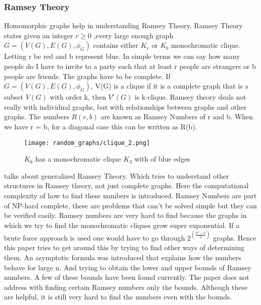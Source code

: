 \documentclass[12pt, a4paper]{Assignment}
\begin{document}
\subsubsection*{Ramsey Theory}
Homomorphic graphs help in understanding Ramsey Theory.
Ramsey Theory states given an integer $ r\geq 0$ ,every large enough graph $G = (V(G),E(G),\phi_G)$ contains either  $K_r $ or ${K_b}$ monochromatic clique.\cite{katz2018introduction}
Letting r be red and b represent blue.
In simple terms we can say how many people do I have to invite to a party such that at least r people are strangers or b people are friends.
The graphs have to be complete.
If $G = (V(G), E(G),\phi_G)$, V(G) is a clique if it is a complete graph that is a subset $V(G)$ with order k, then $V'(G)$ is k-clique.\cite{katz2018introduction} 
Ramsey theory deals not really with individual graphs, but with relationships between graphs and other graphs. 
The numbers $R(r,b)$ are known as Ramsey Numbers of r and b.
When we have r = b, for a diagonal case this can be written as R(b).
\begin{figure}[H]
	\texttt{[image: random\_graphs/clique\_2.png]}
	\caption{$K_6$ has a monochromatic clique $K_3$ with of blue edges}
	\label{clique}
\end{figure}

\cite{burr1981generalized} talks about generalized Ramsey Theory.
Which tries to understand other structures in Ramsey theory, not just complete graphs.
Here the computational complexity of how to find these numbers is introduced.
Ramsey Numbers are part of NP-hard complete, these are problems that can't be solved simple but they can be verified easily.
Ramsey numbers are very hard to find because the graphs in which we try to find the monochromatic cliques grow super exponential.
If a brute force approach is used one would have to go through $2^{\left(\frac{n^2-n}{2}\right)}$ graphs.
Hence this paper tries to get around this by trying to find other ways of determining them.
An asymptotic formula was introduced that explains how the numbers behave for large n.
And trying to obtain the lower and upper bounds of Ramsey numbers.
A few of these bounds have been found currently.
The paper does not address with finding certain Ramsey numbers only the bounds.
Although these are helpful, it is still very hard to find the numbers even with the bounds.
\end{document}
